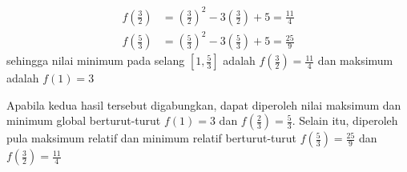 \documentclass{article}
\begin{document}
\begin{enumerate}
\begin{enumerate}
\begin{align*}
		f\left(\frac{3}{2}\right) &=\left(\frac{3}{2}\right)^2-3\left(\frac{3}{2}\right) +5 = \frac{11}{4} \\
		f\left(\frac{5}{3}\right) &= \left(\frac{5}{3}\right)^2-3\left(\frac{5}{3}\right)+5 = \frac{25}{9}
		\end{align*}
		sehingga nilai minimum pada selang $\left[1,\frac{5}{3}\right]$ adalah $f\left(\frac{3}{2}\right) = \frac{11}{4}$ dan maksimum adalah $f(1)=3$
	\end{enumerate}
	Apabila kedua hasil tersebut digabungkan, dapat diperoleh nilai maksimum dan minimum global berturut-turut $f(1)=3$ dan $f\left(\frac{2}{3}\right) = \frac{5}{3}$. Selain itu, diperoleh pula maksimum relatif dan minimum relatif berturut-turut $f\left(\frac{5}{3}\right)=\frac{25}{9}$ dan $f\left(\frac{3}{2}\right)=\frac{11}{4}$\
 

\end{enumerate}
\end{document}
